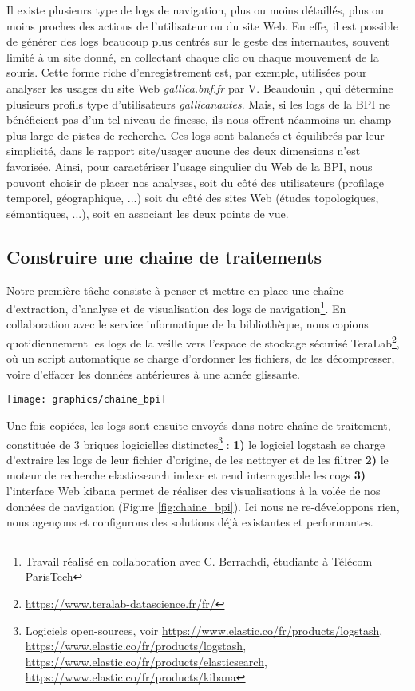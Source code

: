 \documentclass[symmetric,justified,marginals=raggedouter]{tufte-book}
\begin{document}
\noindent Il existe plusieurs type de logs de navigation, plus ou moins détaillés, plus ou moins proches des actions de l'utilisateur ou du site Web. En effe, il est possible de générer des logs beaucoup plus centrés sur le geste des internautes, souvent limité à un site donné, en collectant chaque clic ou chaque mouvement de la souris. Cette forme riche d'enregistrement est, par exemple, utilisées pour analyser les usages du site Web \textit{gallica.bnf.fr} par V. Beaudouin \citep{beaudouin_observer_2014}, qui détermine plusieurs profils type d'utilisateurs \textit{gallicanautes}. Mais, si les logs de la BPI ne bénéficient pas d'un tel niveau de finesse, ils nous offrent néanmoins un champ plus large de pistes de recherche. Ces logs sont balancés et équilibrés par leur simplicité, dans le rapport site/usager aucune des deux dimensions n'est favorisée. Ainsi, pour caractériser l'usage singulier du Web de la BPI, nous pouvont choisir de placer nos analyses, soit du côté des utilisateurs (profilage temporel, géographique, ...) soit du côté des sites Web (études topologiques, sémantiques, ...), soit en associant les deux points de vue.

\subsection{Construire une chaine de traitements}

\noindent Notre première tâche consiste à penser et mettre en place une chaîne d'extraction, d'analyse et de visualisation des logs de navigation\footnote{Travail réalisé en collaboration avec C. Berrachdi, étudiante à Télécom ParisTech}. En collaboration avec le service informatique de la bibliothèque, nous copions quotidiennement les logs de la veille vers l'espace de stockage sécurisé TeraLab\footnote{\url{https://www.teralab-datascience.fr/fr/}}, où un script automatique se charge d'ordonner les fichiers, de les décompresser, voire d'effacer les données antérieures à une année glissante. 

\begin{figure*}
  \texttt{[image: graphics/chaine\_bpi]}
  \caption{Chaine de traitement des logs de navigation de la BPI}
  \label{fig:chaine_bpi}
\end{figure*}

\noindent Une fois copiées, les logs sont ensuite envoyés dans notre chaîne de traitement, constituée de 3 briques logicielles distinctes\footnote{Logiciels open-sources, voir \url{https://www.elastic.co/fr/products/logstash}, \url{https://www.elastic.co/fr/products/logstash}, \url{https://www.elastic.co/fr/products/elasticsearch}, \url{https://www.elastic.co/fr/products/kibana}} : \textbf{1)} le logiciel logstash se charge d'extraire les logs de leur fichier d'origine, de les nettoyer et de les filtrer \textbf{2)} le moteur de recherche elasticsearch indexe et rend interrogeable les cogs \textbf{3)} l'interface Web kibana permet de réaliser des visualisations à la volée de nos données de navigation (Figure \ref{fig:chaine_bpi}). Ici nous ne re-développons rien, nous agençons et configurons des solutions déjà existantes et performantes. 
\end{document}
